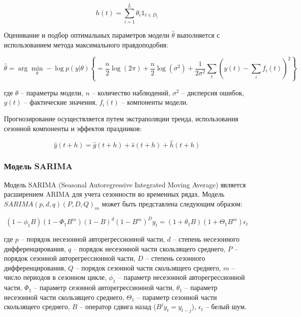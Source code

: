 \begin{equation}
h(t) = \sum_{i=1}^L \theta_i \mathbb{1}_{t \in D_i}
\end{equation}

Оценивание и подбор оптимальных параметров модели $\hat{\theta}$ выполняется с использованием метода максимального правдоподобия:

\begin{equation}
\hat{\theta} = \arg\min_{\theta} -\log p(y | \theta) \left\{ = \frac{n}{2}\log(2\pi) + \frac{n}{2}\log(\sigma^2) + \frac{1}{2\sigma^2}\sum_{t} \left(y(t) - \sum_{i} f_i(t)\right)^2 \right\}
\end{equation}

где $\theta$ -- параметры модели, $n$ -- количество наблюдений, $\sigma^2$ -- дисперсия ошибок, $y(t)$ -- фактические значения, $f_i(t)$ -- компоненты модели.

Прогнозирование осуществляется путем экстраполяции тренда, использования сезонной компоненты и эффектов праздников:

\begin{equation}
\hat{y}(t+h) = \hat{g}(t+h) + \hat{s}(t+h) + \hat{h}(t+h)
\end{equation}

\subsubsection{Модель SARIMA}

Модель SARIMA (Seasonal Autoregressive Integrated Moving Average) является расширением ARIMA для учета сезонности во временных рядах. Модель $SARIMA(p,d,q)(P,D,Q)_m$ может быть представлена следующим образом:

\begin{equation}
(1-\phi_1 B) (1-\Phi_1 B^m)(1-B)^d(1-B^m)^D y_t = (1+\theta_1 B) (1+\Theta_1 B^m)\epsilon_t
\end{equation}

где $p$ -- порядок несезонной авторегрессионной части, $d$ -- степень несезонного дифференцирования, $q$ -- порядок несезонной части скользящего среднего, $P$ -- порядок сезонной авторегрессионной части, $D$ -- степень сезонного дифференцирования, $Q$ -- порядок сезонной части скользящего среднего, $m$ -- число периодов в сезонном цикле, $\phi_1$ -- параметр несезонной авторегрессионной части, $\Phi_1$ -- параметр сезонной авторегрессионной части, $\theta_1$ -- параметр несезонной части скользящего среднего, $\Theta_1$ -- параметр сезонной части скользящего среднего, $B$ -- оператор сдвига назад ($B^j y_t = y_{t-j}$), $\epsilon_t$ -- белый шум.

